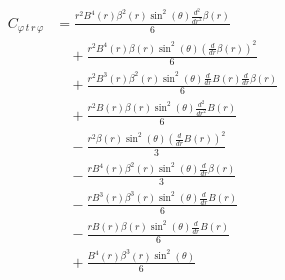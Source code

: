 \documentclass[11pt,a4paper]{article}
\begin{document}
\begin{align*}
  C_{\varphi\,t\,r\,\varphi} &= \frac{r^{2} B^{4}{\left(r \right)} \beta^{2}{\left(r \right)} \sin^{2}{\left(\theta \right)} \frac{d^{2}}{d r^{2}} \beta{\left(r \right)}}{6} \\
  &\quad + \frac{r^{2} B^{4}{\left(r \right)} \beta{\left(r \right)} \sin^{2}{\left(\theta \right)} \left(\frac{d}{d r} \beta{\left(r \right)}\right)^{2}}{6} \\
  &\quad + \frac{r^{2} B^{3}{\left(r \right)} \beta^{2}{\left(r \right)} \sin^{2}{\left(\theta \right)} \frac{d}{d r} B{\left(r \right)} \frac{d}{d r} \beta{\left(r \right)}}{6} \\
  &\quad + \frac{r^{2} B{\left(r \right)} \beta{\left(r \right)} \sin^{2}{\left(\theta \right)} \frac{d^{2}}{d r^{2}} B{\left(r \right)}}{6} \\
  &\quad - \frac{r^{2} \beta{\left(r \right)} \sin^{2}{\left(\theta \right)} \left(\frac{d}{d r} B{\left(r \right)}\right)^{2}}{3} \\
  &\quad - \frac{r B^{4}{\left(r \right)} \beta^{2}{\left(r \right)} \sin^{2}{\left(\theta \right)} \frac{d}{d r} \beta{\left(r \right)}}{3} \\
  &\quad - \frac{r B^{3}{\left(r \right)} \beta^{3}{\left(r \right)} \sin^{2}{\left(\theta \right)} \frac{d}{d r} B{\left(r \right)}}{6} \\
  &\quad - \frac{r B{\left(r \right)} \beta{\left(r \right)} \sin^{2}{\left(\theta \right)} \frac{d}{d r} B{\left(r \right)}}{6} \\
  &\quad + \frac{B^{4}{\left(r \right)} \beta^{3}{\left(r \right)} \sin^{2}{\left(\theta \right)}}{6}
\end{align*}
\end{document}
